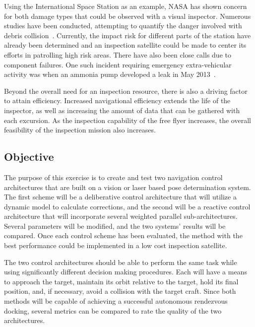 \documentclass[journal, 10pt]{IEEEtran}
\begin{document}
Using the International Space Station as an example, NASA has shown concern for both damage types that could be observed with a visual inspector.  Numerous studies have been conducted, attempting to quantify the danger involved with debris collision~\cite{Risk}.  Currently, the impact risk for different parts of the station have already been determined and an inspection satellite could be made to center its efforts in patrolling high risk areas.  There have also been close calls due to component failures.  One such incident requiring emergency extra-vehicular activity was when an ammonia pump developed a leak in May 2013~\cite{Ammonia}.


Beyond the overall need for an inspection resource, there is also a driving factor to attain efficiency.  Increased navigational efficiency extends the life of the inspector, as well as increasing the amount of data that can be gathered with each excursion.  As the inspection capability of the free flyer increases, the overall feasibility of the inspection mission also increases.


\subsection{Objective}
The purpose of this exercise is to create and test two navigation control architectures that are built on a vision or laser based pose determination system.  The first scheme will be a deliberative control architecture that will utilize a dynamic model to calculate corrections, and the second will be a reactive control architecture that will incorporate several weighted parallel sub-architectures. Several parameters will be modified, and the two systems' results will be compared. Once each control scheme has been evaluated, the method with the best performance could be implemented in a low cost inspection satellite.

The two control architectures should be able to perform the same task while using significantly different decision making procedures.  Each will have a means to approach the target, maintain its orbit relative to the target, hold its final position, and, if necessary, avoid a collision with the target craft.  Since both methods will be capable of achieving a successful autonomous rendezvous docking, several metrics can be compared to rate the quality of the two architectures.
\end{document}
